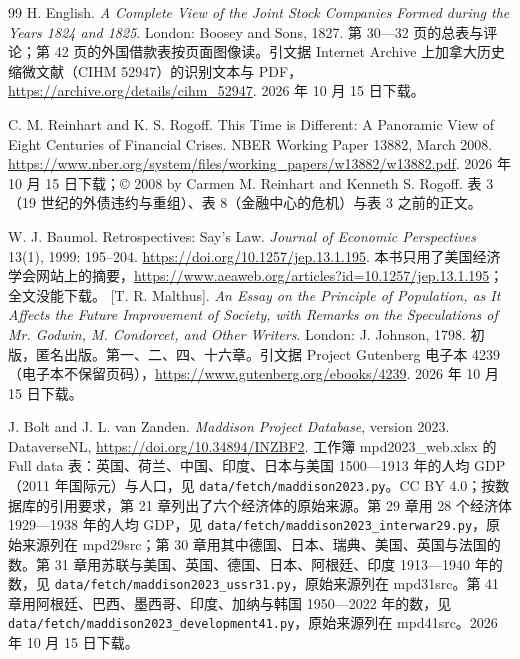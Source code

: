 \begin{thebibliography}{99}
 H. English. \emph{A Complete View of the Joint Stock Companies Formed during the Years 1824 and 1825}. London: Boosey and Sons, 1827. 第 30—32 页的总表与评论；第 42 页的外国借款表按页面图像读。引文据 Internet Archive 上加拿大历史缩微文献（CIHM 52947）的识别文本与 PDF，\url{https://archive.org/details/cihm_52947}. 2026 年 10 月 15 日下载。

 C. M. Reinhart and K. S. Rogoff. This Time is Different: A Panoramic View of Eight Centuries of Financial Crises. NBER Working Paper 13882, March 2008. \url{https://www.nber.org/system/files/working_papers/w13882/w13882.pdf}. 2026 年 10 月 15 日下载；© 2008 by Carmen M. Reinhart and Kenneth S. Rogoff. 表 3（19 世纪的外债违约与重组）、表 8（金融中心的危机）与表 3 之前的正文。

 W. J. Baumol. Retrospectives: Say's Law. \emph{Journal of Economic Perspectives} 13(1), 1999: 195--204. \url{https://doi.org/10.1257/jep.13.1.195}. 本书只用了美国经济学会网站上的摘要，\url{https://www.aeaweb.org/articles?id=10.1257/jep.13.1.195}；全文没能下载。
 [T. R. Malthus]. \emph{An Essay on the Principle of Population, as It Affects the Future Improvement of Society, with Remarks on the Speculations of Mr. Godwin, M. Condorcet, and Other Writers}. London: J. Johnson, 1798. 初版，匿名出版。第一、二、四、十六章。引文据 Project Gutenberg 电子本 4239（电子本不保留页码），\url{https://www.gutenberg.org/ebooks/4239}. 2026 年 10 月 15 日下载。

 J. Bolt and J. L. van Zanden. \emph{Maddison Project Database}, version 2023. DataverseNL, \url{https://doi.org/10.34894/INZBF2}. 工作簿 mpd2023\_web.xlsx 的 Full data 表：英国、荷兰、中国、印度、日本与美国 1500—1913 年的人均 GDP（2011 年国际元）与人口，见 \texttt{data/fetch/maddison2023.py}。CC BY 4.0；按数据库的引用要求，第 21 章列出了六个经济体的原始来源。第 29 章用 28 个经济体 1929—1938 年的人均 GDP，见 \texttt{data/fetch/maddison2023\_interwar29.py}，原始来源列在 mpd29src；第 30 章用其中德国、日本、瑞典、美国、英国与法国的数。第 31 章用苏联与美国、英国、德国、日本、阿根廷、印度 1913—1940 年的数，见 \texttt{data/fetch/maddison2023\_ussr31.py}，原始来源列在 mpd31src。第 41 章用阿根廷、巴西、墨西哥、印度、加纳与韩国 1950—2022 年的数，见 \texttt{data/fetch/maddison2023\_development41.py}，原始来源列在 mpd41src。2026 年 10 月 15 日下载。


\end{thebibliography}

